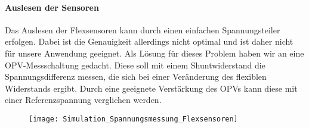 \documentclass[titlepage,12pt,twoside]{article}
\begin{document}
\paragraph{Auslesen der Sensoren}
\hfill \break
\hfill \break
Das Auslesen der Flexsensoren kann durch einen einfachen Spannungsteiler erfolgen. Dabei ist die Genauigkeit
allerdings nicht optimal und ist daher nicht für unsere Anwendung geeignet. Als Lösung für dieses Problem haben wir an eine 
OPV-Messschaltung gedacht. Diese soll mit einem Shuntwiderstand die Spannungsdifferenz messen, die sich bei einer Veränderung 
des flexiblen Widerstands ergibt. Durch eine geeignete Verstärkung des OPVs kann diese mit einer Referenzspannung verglichen 
werden. \\
\begin{figure}[H]
	\begin{center}
		\scalebox{0.8}
		{\texttt{[image: Simulation\_Spannungsmessung\_Flexsensoren]}}
	\end{center}
\end{figure}
\end{document}
